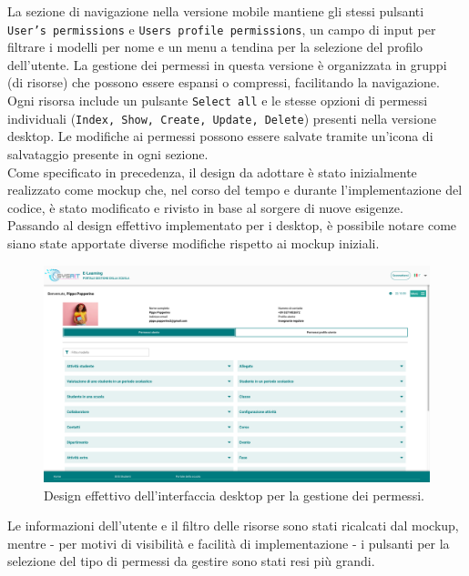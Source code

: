 \documentclass[a4paper, 12pt]{book}
\begin{document}
La sezione di navigazione nella versione mobile mantiene gli stessi pulsanti \texttt{User's permissions} e
\texttt{Users profile permissions}, un campo di input per filtrare i modelli per nome e un menu a tendina per la selezione
del profilo dell'utente. La gestione dei permessi in questa versione è organizzata in gruppi (di risorse) che
possono essere espansi o compressi, facilitando la navigazione. Ogni risorsa include un pulsante \texttt{Select all} e le
stesse opzioni di permessi individuali (\texttt{Index, Show, Create, Update, Delete}) presenti nella versione desktop.
Le modifiche ai permessi possono essere salvate tramite un'icona di salvataggio presente in ogni sezione.\\

Come specificato in precedenza, il design da adottare è stato inizialmente realizzato come mockup che, nel
corso del tempo e durante l'implementazione del codice, è stato modificato e rivisto in base al sorgere di
nuove esigenze.\\

Passando al design effettivo implementato per i desktop, è possibile notare come siano state apportate
diverse modifiche rispetto ai mockup iniziali.

\begin{figure}[H]
  \centering
  \includegraphics[width=\textwidth]{../images/permission-management-desktop.png}
  \caption{Design effettivo dell'interfaccia desktop per la gestione dei permessi.}
  \label{fig:final-desktop}
\end{figure}

Le informazioni dell'utente e il filtro delle risorse sono stati ricalcati dal mockup, mentre - per motivi di visibilità
e facilità di implementazione - i pulsanti per la selezione del tipo di permessi da gestire sono stati resi più grandi.\\
\end{document}
